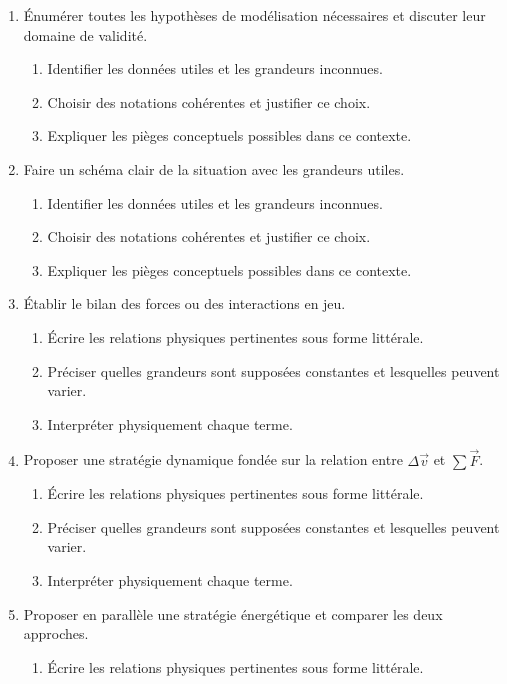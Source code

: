 \documentclass[11pt,a4paper]{article}
\begin{document}
\begin{enumerate}[label=\textbf{Très long \arabic*.},leftmargin=*]
\begin{enumerate}[label=\textbf{\arabic*)}]
\begin{enumerate}[label=\alph*)]
\end{enumerate}
\item Énumérer toutes les hypothèses de modélisation nécessaires et discuter leur domaine de validité.
\begin{enumerate}[label=\alph*)]
\item Identifier les données utiles et les grandeurs inconnues.
\item Choisir des notations cohérentes et justifier ce choix.
\item Expliquer les pièges conceptuels possibles dans ce contexte.
\end{enumerate}
\item Faire un schéma clair de la situation avec les grandeurs utiles.
\begin{enumerate}[label=\alph*)]
\item Identifier les données utiles et les grandeurs inconnues.
\item Choisir des notations cohérentes et justifier ce choix.
\item Expliquer les pièges conceptuels possibles dans ce contexte.
\end{enumerate}
\item Établir le bilan des forces ou des interactions en jeu.
\begin{enumerate}[label=\alph*)]
\item Écrire les relations physiques pertinentes sous forme littérale.
\item Préciser quelles grandeurs sont supposées constantes et lesquelles peuvent varier.
\item Interpréter physiquement chaque terme.
\end{enumerate}
\item Proposer une stratégie dynamique fondée sur la relation entre $\Delta\vec v$ et $\sum\vec F$.
\begin{enumerate}[label=\alph*)]
\item Écrire les relations physiques pertinentes sous forme littérale.
\item Préciser quelles grandeurs sont supposées constantes et lesquelles peuvent varier.
\item Interpréter physiquement chaque terme.
\end{enumerate}
\item Proposer en parallèle une stratégie énergétique et comparer les deux approches.
\begin{enumerate}[label=\alph*)]
\item Écrire les relations physiques pertinentes sous forme littérale.

\end{enumerate}
\end{enumerate}
\end{enumerate}
\end{document}
